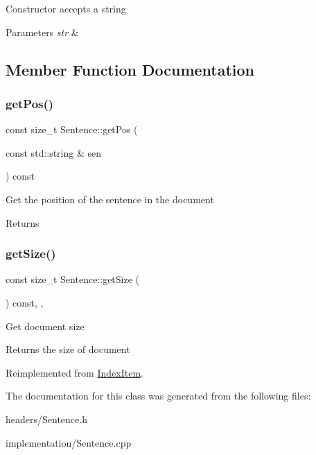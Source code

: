 Constructor accepts a string 
\begin{DoxyParams}{Parameters}
{\em str} & \\
\hline
\end{DoxyParams}


\subsection{Member Function Documentation}
\mbox{\label{classSentence_ab3d1877176dc98185753ee23a0897c1d}} 
\subsubsection{\texorpdfstring{get\+Pos()}{getPos()}}
{\footnotesize\ttfamily const size\+\_\+t Sentence\+::get\+Pos (\begin{DoxyParamCaption}\item[{const std\+::string \&}]{sen }\end{DoxyParamCaption}) const}

Get the position of the sentence in the document \begin{DoxyReturn}{Returns}

\end{DoxyReturn}
\mbox{\label{classSentence_a2f55ca4244f2ee9c1762019b37734330}} 
\subsubsection{\texorpdfstring{get\+Size()}{getSize()}}
{\footnotesize\ttfamily const size\+\_\+t Sentence\+::get\+Size (\begin{DoxyParamCaption}{ }\end{DoxyParamCaption}) const\hspace{0.3cm}{\ttfamily [final]}, {\ttfamily [override]}, {\ttfamily [virtual]}}

Get document size \begin{DoxyReturn}{Returns}
the size of document 
\end{DoxyReturn}


Reimplemented from \hyperlink{classIndexItem_a37bb9320946eedfe8360bc740eb0c11b}{Index\+Item}.



The documentation for this class was generated from the following files\+:\begin{DoxyCompactItemize}
\item 
headers/Sentence.\+h\item 
implementation/Sentence.\+cpp\end{DoxyCompactItemize}
